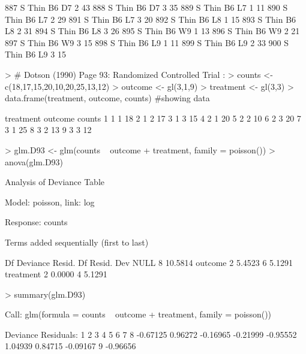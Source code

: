 \documentclass{article}
\begin{document}
\begin{Schunk}
\begin{Soutput}
887       S   Thin   B6      D7     2    43
888       S   Thin   B6      D7     3    35
889       S   Thin   B6      L7     1    11
890       S   Thin   B6      L7     2    29
891       S   Thin   B6      L7     3    20
892       S   Thin   B6      L8     1    15
893       S   Thin   B6      L8     2    31
894       S   Thin   B6      L8     3    26
895       S   Thin   B6      W9     1    13
896       S   Thin   B6      W9     2    21
897       S   Thin   B6      W9     3    15
898       S   Thin   B6      L9     1    11
899       S   Thin   B6      L9     2    33
900       S   Thin   B6      L9     3    15
\end{Soutput}
\begin{Sinput}
> # Dotson (1990) Page 93: Randomized Controlled Trial :
> counts <- c(18,17,15,20,10,20,25,13,12)
> outcome <- gl(3,1,9)
> treatment <- gl(3,3)
> data.frame(treatment, outcome, counts)  #showing data
\end{Sinput}
\begin{Soutput}
  treatment outcome counts
1         1       1     18
2         1       2     17
3         1       3     15
4         2       1     20
5         2       2     10
6         2       3     20
7         3       1     25
8         3       2     13
9         3       3     12
\end{Soutput}
\begin{Sinput}
> glm.D93 <- glm(counts ~ outcome + treatment, family = poisson())
> anova(glm.D93)
\end{Sinput}
\begin{Soutput}
Analysis of Deviance Table

Model: poisson, link: log

Response: counts

Terms added sequentially (first to last)


          Df Deviance Resid. Df Resid. Dev
NULL                          8    10.5814
outcome    2   5.4523         6     5.1291
treatment  2   0.0000         4     5.1291
\end{Soutput}
\begin{Sinput}
> summary(glm.D93)
\end{Sinput}
\begin{Soutput}
Call:
glm(formula = counts ~ outcome + treatment, family = poisson())

Deviance Residuals: 
       1         2         3         4         5         6         7         8  
-0.67125   0.96272  -0.16965  -0.21999  -0.95552   1.04939   0.84715  -0.09167  
       9  
-0.96656  


\end{Soutput}
\end{Schunk}
\end{document}
